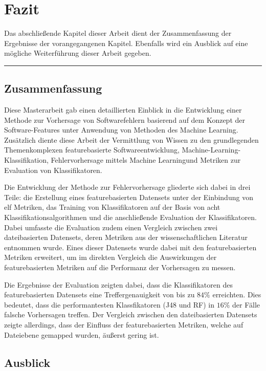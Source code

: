 
\chapter{Fazit}
\label{conclusion}

Das abschließende Kapitel dieser Arbeit dient der Zusammenfassung der Ergebnisse der vorangegangenen Kapitel. Ebenfalls wird ein Ausblick auf eine mögliche Weiterführung dieser Arbeit gegeben.
\\
\hrule

\section{Zusammenfassung}
Diese Masterarbeit gab einen detaillierten Einblick in die Entwicklung einer Methode zur Vorhersage von Softwarefehlern basierend auf dem Konzept der Software-Features unter Anwendung von Methoden des Machine Learning. Zusätzlich diente diese Arbeit der Vermittlung von Wissen zu den grundlegenden Themenkomplexen \glqq featurebasierte Softwareentwicklung\grqq{}, \glqq Machine-Learning-Klassifikation\grqq{}, \glqq Fehlervorhersage mittels Machine Learning\grqq und \glqq Metriken zur Evaluation von Klassifikatoren\grqq.

Die Entwicklung der Methode zur Fehlervorhersage gliederte sich dabei in drei Teile: die Erstellung eines featurebasierten Datensets unter der Einbindung von elf Metriken, das Training von Klassifikatoren auf der Basis von acht Klassifikationsalgorithmen und die anschließende Evaluation der Klassifikatoren. Dabei umfasste die Evaluation zudem einen Vergleich zwischen zwei dateibasierten Datensets, deren Metriken aus der wissenschaftlichen Literatur entnommen wurde. Eines dieser Datensets wurde dabei mit den featurebasierten Metriken erweitert, um im direkten Vergleich die Auswirkungen der featurebasierten Metriken auf die Performanz der Vorhersagen zu messen.

Die Ergebnisse der Evaluation zeigten dabei, dass die Klassifikatoren des featurebasierten Datensets eine Treffergenauigkeit von bis zu $84\%$ erreichten. Dies bedeutet, dass die performantesten Klassfikatoren (J48 und RF) in $16\%$ der Fälle falsche Vorhersagen treffen. Der Vergleich zwischen den dateibasierten Datensets zeigte allerdings, dass der Einfluss der featurebasierten Metriken, welche auf Dateiebene gemapped wurden, äußerst gering ist. 

\section{Ausblick}

